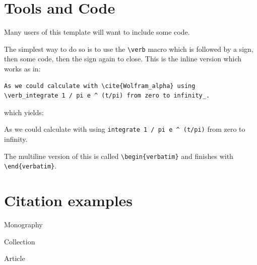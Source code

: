 \section{Tools and Code}

Many users of this template will want to include some code.

The simplest way to do so is to use the \verb+\verb+ macro which is followed by a sign, then some code, then the sign again to close. This is the inline version which works as in: 


\begin{verbatim}
As we could calculate with \cite{Wolfram_alpha} using 
\verb_integrate 1 / pi e ^ (t/pi) from zero to infinity_.
\end{verbatim}

which yields: 

As we could calculate with \cite{Wolfram_alpha} using \verb_integrate 1 / pi e ^ (t/pi)_ from zero to infinity.


The multiline version of this is called \verb+\begin{verbatim}+ and finishes with \verb+\end{verbatim}+.


\section{Citation examples}

Monography \citep[][S. 22]{con:infra} 

Collection \citep{sammelband} 

Article \citep{article1}
